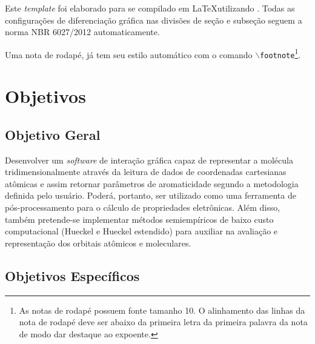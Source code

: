 Este \emph{template} foi elaborado para se compilado em \LaTeX utilizando \abnTeX.  Todas as configurações de diferenciação gráfica nas divisões de seção e subseção seguem a  norma NBR 6027/2012 automaticamente. 

Uma nota de rodapé, já tem seu estilo automático com o comando \texttt{$\backslash$footnote}\footnote{As notas de rodapé possuem fonte tamanho 10. O alinhamento das linhas da nota de rodapé deve ser abaixo da primeira letra da primeira palavra da nota de modo dar destaque ao expoente.}.


\section{Objetivos}

\subsection{Objetivo Geral}

 Desenvolver um \textit{software} de interação gráfica capaz de representar a molécula tridimensionalmente através da leitura de dados de coordenadas cartesianas atômicas e assim retornar parâmetros de aromaticidade segundo a metodologia definida pelo usuário. Poderá, portanto, ser utilizado como uma ferramenta de pós-processamento para o cálculo de propriedades eletrônicas. Além disso, também pretende-se implementar métodos semiempíricos de baixo custo computacional (Hueckel e Hueckel estendido) para auxiliar na avaliação e representação dos orbitais atômicos e moleculares.

\subsection{Objetivos Específicos}

